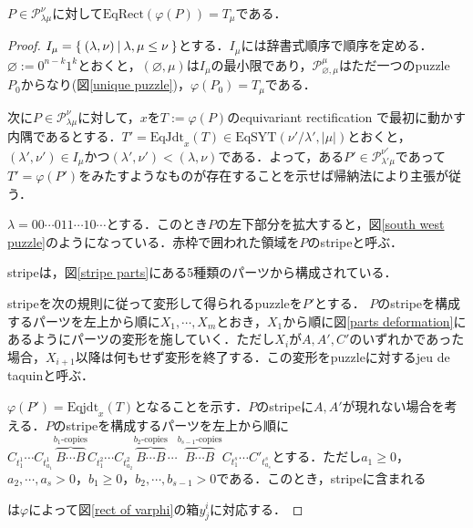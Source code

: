 \begin{prop}\label{main theorem 1}
  $P\in\mathcal{P}^\nu_{\lambda\mu}$に対して$\text{EqRect}(\varphi(P))=T_\mu$である．
\end{prop}

\begin{proof}
  $I_{\mu} = \left\{\:(\lambda,\nu)\:\middle|\:\lambda,\mu \leq \nu\:\right\}$とする．$I_{\mu}$には辞書式順序で順序を定める．$\varnothing:=0^{n-k}1^k$とおくと，$(\varnothing,\mu)$は$I_{\mu}$の最小限であり，$\mathcal{P}^\mu_{\varnothing,\mu}$はただ一つのpuzzle $P_0$からなり(図\ref{unique puzzle})，$\varphi(P_0)=T_\mu$である．
  
  

  次に$P\in\mathcal{P}^\nu_{\lambda\mu}$に対して，$x$を$T:=\varphi(P)$のequivariant rectification で最初に動かす内隅であるとする．$T'=\text{EqJdt}_{x}(T)\in \text{EqSYT}(\nu'/\lambda',|\mu|)$とおくと，$(\lambda',\nu')\in I_{\mu}$かつ$(\lambda',\nu') < (\lambda,\nu)$である．よって，ある$P'\in\mathcal{P}^{\nu'}_{\lambda'\mu}$であって$T' = \varphi(P')$をみたすようなものが存在することを示せば帰納法により主張が従う．

  $\lambda=00\cdots011\cdots10\cdots$とする．このとき$P$の左下部分を拡大すると，図\ref{south west puzzle}のようになっている．赤枠で囲われた領域を$P$のstripeと呼ぶ．

  

  stripeは，図\ref{stripe parts}にある5種類のパーツから構成されている．

  
  
  stripeを次の規則に従って変形して得られるpuzzleを$P'$とする．
  $P$のstripeを構成するパーツを左上から順に$X_1,\cdots,X_m$とおき，$X_1$から順に図\ref{parts deformation}にあるようにパーツの変形を施していく．ただし$X_i$が$A,A',C'$のいずれかであった場合，$X_{i+1}$以降は何もせず変形を終了する．この変形をpuzzleに対するjeu de taquinと呼ぶ．

  

  $\varphi(P') =\text{Eqjdt}_x(T)$となることを示す．$P$のstripeに$A,A'$が現れない場合を考える．$P$のstripeを構成するパーツを左上から順に$C_{t^1_1}\cdots C_{t^1_{a_1}}\overbrace{B\cdots B}^{b_1\text{-copies}} C_{t^2_1}\cdots C_{t^2_{a_2}} \overbrace{B\cdots B}^{b_2\text{-copies}}\cdots \overbrace{B\cdots B}^{b_{s-1}\text{-copies}} C_{t^s_1}\cdots C'_{t^s_{a_s}}$とする．ただし$a_1\geq 0$，$a_2,\cdots,a_s>0$，$b_1\geq 0$，$b_2,\cdots,b_{s-1}>0$である．このとき，stripeに含まれる
  は$\varphi$によって図\ref{rect of varphi}の箱$y^i_j$に対応する．


\end{proof}
